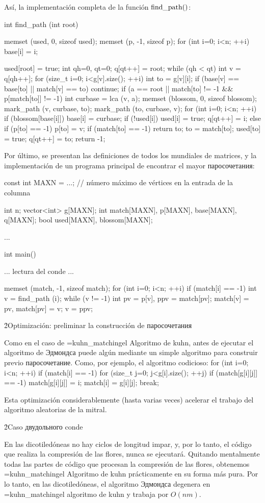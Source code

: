 {Así, la implementación completa de la función $\rm find\_path()$:

\code
int find_path (int root) {
memset (used, 0, sizeof used);
memset (p, -1, sizeof p);
for (int i=0; i<n; ++i)
base[i] = i;

used[root] = true;
int qh=0, qt=0;
q[qt++] = root;
while (qh < qt) {
int v = q[qh++];
for (size_t i=0; i<g[v].size(); ++i) {
int to = g[v][i];
if (base[v] == base[to] || match[v] == to) continue;
if (a == root || match[to] != -1 && p[match[to]] != -1) {
int curbase = lca (v, a);
memset (blossom, 0, sizeof blossom);
mark_path (v, curbase, to);
mark_path (to, curbase, v);
for (int i=0; i<n; ++i)
if (blossom[base[i]]) {
base[i] = curbase;
if (!used[i]) {
used[i] = true;
q[qt++] = i;
}
}
}
else if (p[to] == -1) {
p[to] = v;
if (match[to] == -1)
return to;
to = match[to];
used[to] = true;
q[qt++] = to;
}
}
}
return -1;
}
\endcode

Por último, se presentan las definiciones de todos los mundiales de matrices, y la implementación de un programa principal de encontrar el mayor паросочетания:

\code
const int MAXN = ...; // número máximo de vértices en la entrada de la columna

int n;
vector<int> g[MAXN];
int match[MAXN], p[MAXN], base[MAXN], q[MAXN];
bool used[MAXN], blossom[MAXN];

...

int main() {
... lectura del conde ...

memset (match, -1, sizeof match);
for (int i=0; i<n; ++i)
if (match[i] == -1) {
int v = find_path (i);
while (v != -1) {
int pv = p[v], ppv = match[pv];
match[v] = pv, match[pv] = v;
v = ppv;
}
}
}
\endcode


\h2{Optimización: preliminar la construcción de паросочетания}

Como en el caso de \algohref=kuhn_matching{el Algoritmo de kuhn}, antes de ejecutar el algoritmo de Эдмондса puede algún mediante un simple algoritmo para construir previo паросочетание. Como, por ejemplo, el algoritmo codicioso:
\code
for (int i=0; i<n; ++i)
if (match[i] == -1)
for (size_t j=0; j<g[i].size(); ++j)
if (match[g[i][j]] == -1) {
match[g[i][j]] = i;
match[i] = g[i][j];
break;
}
\endcode

Esta optimización considerablemente (hasta varias veces) acelerar el trabajo del algoritmo aleatorias de la mitral.


\h2{Caso двудольного conde}

En las dicotiledóneas no hay ciclos de longitud impar, y, por lo tanto, el código que realiza la compresión de las flores, nunca se ejecutará. Quitando mentalmente todas las partes de código que procesan la compresión de las flores, obtenemos \algohref=kuhn_matching{el Algoritmo de kuhn} prácticamente en su forma más pura. Por lo tanto, en las dicotiledóneas, el algoritmo Эдмондса degenera en \algohref=kuhn_matching{el algoritmo de kuhn} y trabaja por $O (n m)$.


}
